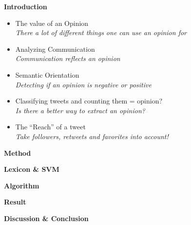 \documentclass[landscape,20pt]{extarticle}
\newcommand*{\TitleFont}{\Huge \bf}
\newcommand*{\TextFont}{\normalsize \it}
\begin{document}
\thispagestyle{empty}
\Large
{\TitleFont Introduction}

\begin{itemize}
\item The value of an Opinion\\
{\TextFont There a lot of different things one can use an opinion for}
\item Analyzing Communication\\
{\TextFont Communication reflects an opinion}
\item Semantic Orientation\\
{\TextFont Detecting if an opinion is negative or positive}
\item Classifying tweets and counting them = opinion?\\
{\TextFont Is there a better way to extract an opinion?}
\item The ``Reach'' of a tweet\\
{\TextFont Take followers, retweets and favorites into account!}
\end{itemize}

\clearpage
\thispagestyle{empty}

{\TitleFont Method}


\clearpage
\thispagestyle{empty}

{\TitleFont Lexicon \& SVM}

\clearpage
\thispagestyle{empty}

{\TitleFont Algorithm}

\clearpage
\thispagestyle{empty}

{\TitleFont Result}

\clearpage
\thispagestyle{empty}

{\TitleFont Discussion \& Conclusion}
\end{document}
